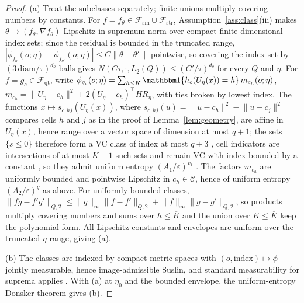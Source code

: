 \documentclass[11pt]{article}
\newcommand{\ind}[1]{\mathbbm 1\{#1\}}
\newcommand{\calC}{\mathcal C}
\newcommand{\calF}{\mathcal F}
\newcommand{\eps}{\varepsilon}
\newcommand{\norm}[1]{\lVert #1\rVert}
\begin{document}
\begin{proof}
(a) Treat the subclasses separately; finite unions multiply covering numbers by constants. For $f=f_\theta\in\calF_{\mathrm{sm}}\cup\calF_{\mathrm{str}}$, Assumption~\ref{ass:class}(iii) makes $\theta\mapsto(f_\theta,\nabla f_\theta)$ Lipschitz in supremum norm over compact finite-dimensional index sets; since the residual is bounded in the truncated range, $|\phi_{f_\theta}(o;\eta)-\phi_{f_{\theta'}}(o;\eta)|\le C\norm{\theta-\theta'}$ pointwise, so covering the index set by $(3\,\mathrm{diam}/\tau)^{d_\theta}$ balls gives $N(C\tau,\cdot,L_2(Q))\le(C'/\tau)^{d_\theta}$ for every $Q$ and $\eta$. For $f=g_c\in\calF_{\mathrm{qt}}$, write
$\phi_{g_c}(o;\eta)=\sum_{h\le K}\ind{h_c(U_\eta(x))=h}\,m_{c_h}(o;\eta)$,
$m_{c_h}=\norm{U_\eta-c_h}^2+2(U_\eta-c_h)^\top HR_\eta$,
with ties broken by lowest index. The functions $x\mapsto s_{c,hj}(U_\eta(x))$, where $s_{c,hj}(u)=\norm{u-c_h}^2-\norm{u-c_j}^2$ compares cells $h$ and $j$ as in the proof of Lemma~\ref{lem:geometry}, are affine in $U_\eta(x)$, hence range over a vector space of dimension at most $q+1$; the sets $\{s\le0\}$ therefore form a VC class of index at most $q+3$ \citep[Lemma~2.6.15 and Lemma~2.6.18]{vdvwellner1996}, cell indicators are intersections of at most $\overline K-1$ such sets and remain VC with index bounded by a constant \citep[Lemma~2.6.17]{vdvwellner1996}, so they admit uniform entropy $(A_1/\eps)^{v_1}$ \citep[Theorem~2.6.7]{vdvwellner1996}. The factors $m_{c_h}$ are uniformly bounded and pointwise Lipschitz in $c_h\in\calC$, hence of uniform entropy $(A_2/\eps)^{q}$ as above. For uniformly bounded classes, $\norm{fg-f'g'}_{Q,2}\le\norm{g}_\infty\norm{f-f'}_{Q,2}+\norm{f}_\infty\norm{g-g'}_{Q,2}$, so products multiply covering numbers and sums over $h\le\overline K$ and the union over $K\le\overline K$ keep the polynomial form. All Lipschitz constants and envelopes are uniform over the truncated $\eta$-range, giving (a).

(b) The classes are indexed by compact metric spaces with $(o,\text{index})\mapsto\phi$ jointly measurable, hence image-admissible Suslin, and standard measurability for suprema applies \citep[Section~8.2]{kosorok2008}. With (a) at $\eta_0$ and the bounded envelope, the uniform-entropy Donsker theorem \citep[Theorem~2.5.2]{vdvwellner1996} gives (b).


\end{proof}
\end{document}
